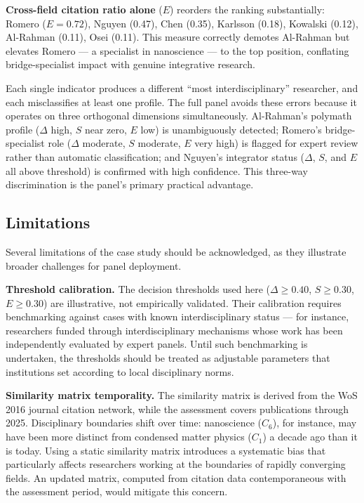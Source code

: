 \documentclass[
]{article}
\begin{document}
\textbf{Cross-field citation ratio alone} (\(E\)) reorders the ranking
substantially: Romero (\(E = 0.72\)), Nguyen (0.47), Chen (0.35),
Karlsson (0.18), Kowalski (0.12), Al-Rahman (0.11), Osei (0.11). This
measure correctly demotes Al-Rahman but elevates Romero --- a specialist
in nanoscience --- to the top position, conflating bridge-specialist
impact with genuine integrative research.

Each single indicator produces a different ``most interdisciplinary''
researcher, and each misclassifies at least one profile. The full panel
avoids these errors because it operates on three orthogonal dimensions
simultaneously. Al-Rahman's polymath profile (\(\Delta\) high, \(S\)
near zero, \(E\) low) is unambiguously detected; Romero's
bridge-specialist role (\(\Delta\) moderate, \(S\) moderate, \(E\) very
high) is flagged for expert review rather than automatic classification;
and Nguyen's integrator status (\(\Delta\), \(S\), and \(E\) all above
threshold) is confirmed with high confidence. This three-way
discrimination is the panel's primary practical advantage.

\hypertarget{limitations}{%
\subsection{Limitations}\label{limitations}}

Several limitations of the case study should be acknowledged, as they
illustrate broader challenges for panel deployment.

\textbf{Threshold calibration.} The decision thresholds used here
(\(\Delta \geq 0.40\), \(S \geq 0.30\), \(E \geq 0.30\)) are
illustrative, not empirically validated. Their calibration requires
benchmarking against cases with known interdisciplinary status --- for
instance, researchers funded through interdisciplinary mechanisms whose
work has been independently evaluated by expert panels. Until such
benchmarking is undertaken, the thresholds should be treated as
adjustable parameters that institutions set according to local
disciplinary norms.

\textbf{Similarity matrix temporality.} The similarity matrix is derived
from the WoS 2016 journal citation network, while the assessment covers
publications through 2025. Disciplinary boundaries shift over time:
nanoscience (\(C_6\)), for instance, may have been more distinct from
condensed matter physics (\(C_1\)) a decade ago than it is today. Using
a static similarity matrix introduces a systematic bias that
particularly affects researchers working at the boundaries of rapidly
converging fields. An updated matrix, computed from citation data
contemporaneous with the assessment period, would mitigate this concern.
\end{document}
